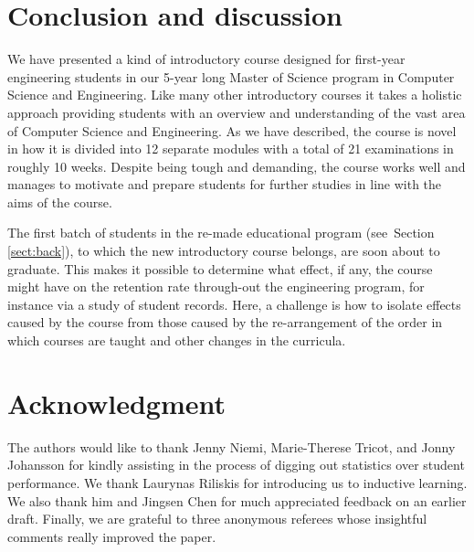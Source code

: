 \documentclass[conference]{IEEEtran}
\begin{document}
\section{Conclusion and discussion}

We have presented a kind of introductory course designed for first-year engineering students in our 5-year long Master of Science program in Computer Science and Engineering. Like many other introductory courses it takes a holistic approach providing students with an overview and understanding of the vast area of Computer Science and Engineering. As we have described, the course is novel in how it is divided into 12 separate modules with a total of 21 examinations in roughly 10 weeks. Despite being tough and demanding, the course works well and manages to motivate and prepare students for further studies in line with the aims of the course. 

The first batch of students in the re-made educational program (see~Section \ref{sect:back}), to which the new introductory course belongs, are soon about to graduate. This makes it possible to determine what effect, if any, the course might have on the retention rate through-out the engineering program, for instance via a study of student records. Here, a challenge is how to isolate effects caused by the course from those caused by the re-arrangement of the order in which courses are taught and other changes in the curricula. 

\section*{Acknowledgment}

The authors would like to thank Jenny Niemi, Marie-Therese Tricot, and Jonny Johansson for kindly assisting in the process of digging out statistics over 
student performance. We thank Laurynas Riliskis for introducing us to inductive learning. We also thank him and Jingsen Chen for much appreciated feedback on an earlier draft. Finally, we are grateful to three anonymous referees whose insightful comments really improved the paper. 

%


\end{document}

